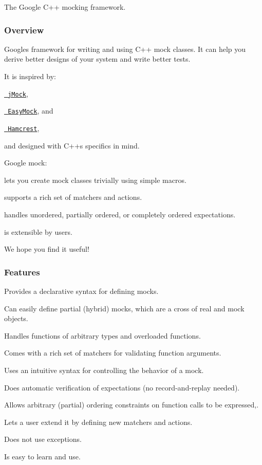 The Google C++ mocking framework.

\subsubsection*{Overview}

Google\textquotesingle{}s framework for writing and using C++ mock classes. It can help you derive better designs of your system and write better tests.

It is inspired by\+:


\begin{DoxyItemize}
\item \href{http://www.jmock.org/}\texttt{ j\+Mock},
\item \href{http://www.easymock.org/}\texttt{ Easy\+Mock}, and
\item \href{http://code.google.com/p/hamcrest/}\texttt{ Hamcrest},
\end{DoxyItemize}

and designed with C++\textquotesingle{}s specifics in mind.

Google mock\+:


\begin{DoxyItemize}
\item lets you create mock classes trivially using simple macros.
\item supports a rich set of matchers and actions.
\item handles unordered, partially ordered, or completely ordered expectations.
\item is extensible by users.
\end{DoxyItemize}

We hope you find it useful!

\subsubsection*{Features}


\begin{DoxyItemize}
\item Provides a declarative syntax for defining mocks.
\item Can easily define partial (hybrid) mocks, which are a cross of real and mock objects.
\item Handles functions of arbitrary types and overloaded functions.
\item Comes with a rich set of matchers for validating function arguments.
\item Uses an intuitive syntax for controlling the behavior of a mock.
\item Does automatic verification of expectations (no record-\/and-\/replay needed).
\item Allows arbitrary (partial) ordering constraints on function calls to be expressed,.
\item Lets a user extend it by defining new matchers and actions.
\item Does not use exceptions.
\item Is easy to learn and use.
\end{DoxyItemize}

